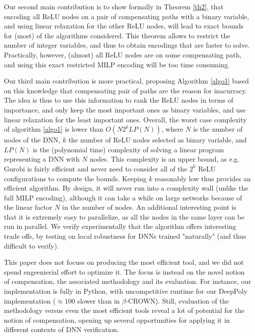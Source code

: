 Our second main contribution is to show formally in Theorem \ref{th2}, that 
encoding all ReLU nodes on a pair of compensating paths with a binary variable,
and using linear relaxation for the other ReLU nodes, will lead to exact bounds for (most) of the algorithms considered. This theorem allows to restrict the number of integer variables, and thus to obtain encodings that are faster to solve. Practically, however, (almost) all ReLU nodes are on some compensating path, and using this exact restricted MILP encoding will be too time consuming.

Our third main contribution is more practical, proposing Algorithm \ref{algo1} based on this knowledge that compensating pair of paths are the reason for inacurracy. The idea is thus to use this information to rank the ReLU nodes in terms of importance, and only keep the most important ones as binary variables, and use linear relaxation for the least important ones.
Overall, the worst case complexity of algorithm \ref{algo1} is lower than $O(N 2^k LP(N))$, where $N$ is the number of nodes of the DNN, $k$ the number of ReLU nodes selected as binary variable, and $LP(N)$ is the (polynomial time) complexity of solving a linear program representing a DNN with $N$ nodes. This complexity is an upper bound, as e.g. Gurobi is fairly efficient and never need to consider all of the $2^k$ ReLU configurations to compute the bounds. Keeping $k$ reasonably low thus provides an efficient algorithm. 
By design, it will never run into a complexity wall (unlike the full MILP encoding), although it can take a while on large networks because of the linear factor $N$ in the number of nodes. An additional interesting point is that it is extremely easy to parallelize, as all the nodes in the same layer can be run in parallel. 
We verify experimentally that the algorithm offers interesting trade offs, by testing on local robustness for DNNs trained "naturally" 
(and thus difficult to verify).



This paper does not focuss on producing the most efficient tool, and we did not spend engeenierial effort to optimize it. The focus is instead on the novel notion of compensation, the associated methodology and its evaluation. For instance, our implementation is fully in Python, with uncompetitive runtime for our DeepPoly implementation ($\approx 100$ slower than in $\beta$-CROWN). Still, evaluation of the methodology versus even the most efficient tools reveal a lot of potential for the notion of compensation, opening up several opportunities for applying it in different contexts of DNN verification. 

